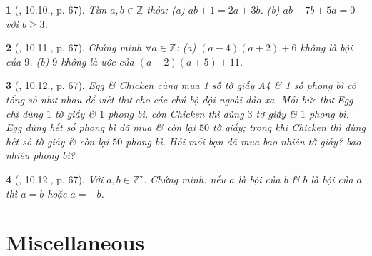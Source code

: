 \documentclass{article}
\newtheorem{baitoan}{}
\begin{document}
\begin{baitoan}[\cite{Binh_boi_duong_Toan_6_tap_1}, 10.10., p. 67]
	Tìm $a,b\in\mathbb{Z}$ thỏa: (a) $ab + 1 = 2a + 3b$. (b) $ab - 7b + 5a = 0$ với $b\ge3$.
\end{baitoan}

\begin{baitoan}[\cite{Binh_boi_duong_Toan_6_tap_1}, 10.11., p. 67]
	Chứng minh $\forall a\in\mathbb{Z}$: (a) $(a - 4)(a + 2) + 6$ không là bội của $9$. (b) $9$ không là ước của $(a - 2)(a + 5) + 11$.
\end{baitoan}

\begin{baitoan}[\cite{Binh_boi_duong_Toan_6_tap_1}, 10.12., p. 67]
	Egg \& Chicken cùng mua 1 số tờ giấy A4 \& 1 số phong bì có tổng số như nhau để viết thư cho các chú bộ đội ngoài đảo xa. Mỗi bức thư Egg chỉ dùng $1$ tờ giấy \& $1$ phong bì, còn Chicken thì dùng $3$ tờ giấy \& $1$ phong bì. Egg dùng hết số phong bì đã mua \& còn lại $50$ tờ giấy; trong khi Chicken thì dùng hết số tờ giấy \& còn lại $50$ phong bì. Hỏi mỗi bạn đã mua bao nhiêu tờ giấy? bao nhiêu phong bì?
\end{baitoan}

\begin{baitoan}[\cite{Binh_boi_duong_Toan_6_tap_1}, 10.12., p. 67]
	Với $a,b\in\mathbb{Z}^\star$. Chứng minh: nếu $a$ là bội của $b$ \& $b$ là bội của $a$ thì $a = b$ hoặc $a = -b$.
\end{baitoan}


\section{Miscellaneous}


\printbibliography[heading=bibintoc]
	
\end{document}
